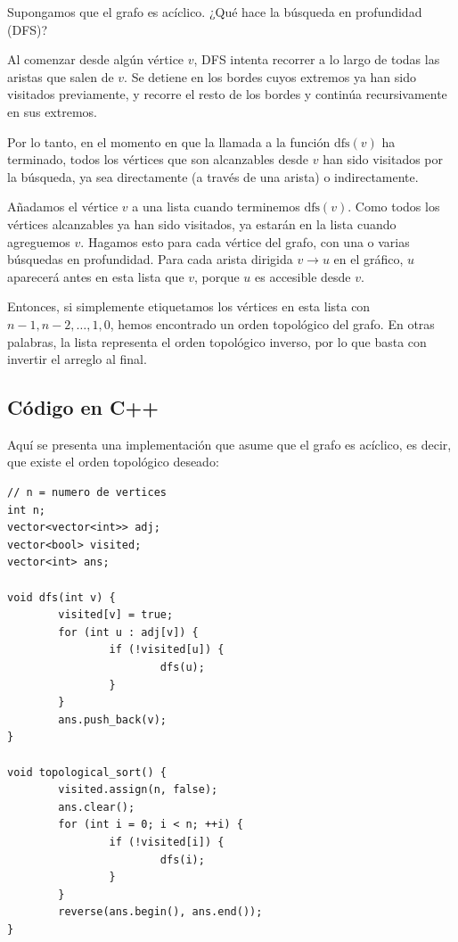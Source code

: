 Supongamos que el grafo es acíclico. ¿Qué hace la búsqueda en profundidad (DFS)?

Al comenzar desde algún vértice $v$, DFS intenta recorrer a lo largo de todas las aristas que salen de $v$. Se detiene en los bordes cuyos extremos ya han sido visitados previamente, y recorre el resto de los bordes y continúa recursivamente en sus extremos.

Por lo tanto, en el momento en que la llamada a la función $\text{dfs}(v)$ ha terminado, todos los vértices que son alcanzables desde $v$ han sido visitados por la búsqueda, ya sea directamente (a través de una arista) o indirectamente.

Añadamos el vértice $v$ a una lista cuando terminemos $\text{dfs}(v)$. Como todos los vértices alcanzables ya han sido visitados, ya estarán en la lista cuando agreguemos $v$. Hagamos esto para cada vértice del grafo, con una o varias búsquedas en profundidad. Para cada arista dirigida $v \rightarrow u$ en el gráfico, $u$ aparecerá antes en esta lista que $v$, porque $u$ es accesible desde $v$. 

Entonces, si simplemente etiquetamos los vértices en esta lista con $n-1, n-2, \dots, 1, 0$, hemos encontrado un orden topológico del grafo. En otras palabras, la lista representa el orden topológico inverso, por lo que basta con invertir el arreglo al final.

\subsection*{Código en C++}

Aquí se presenta una implementación que asume que el grafo es acíclico, es decir, que existe el orden topológico deseado:

\begin{lstlisting}[caption=Orden Topológico con DFS]
// n = numero de vertices
int n; 
vector<vector<int>> adj; 
vector<bool> visited;
vector<int> ans;

void dfs(int v) {
        visited[v] = true;
        for (int u : adj[v]) {
                if (!visited[u]) {
                        dfs(u);
                }
        }
        ans.push_back(v);
}

void topological_sort() {
        visited.assign(n, false);
        ans.clear();
        for (int i = 0; i < n; ++i) {
                if (!visited[i]) {
                        dfs(i);
                }
        }
        reverse(ans.begin(), ans.end());
}
\end{lstlisting}

